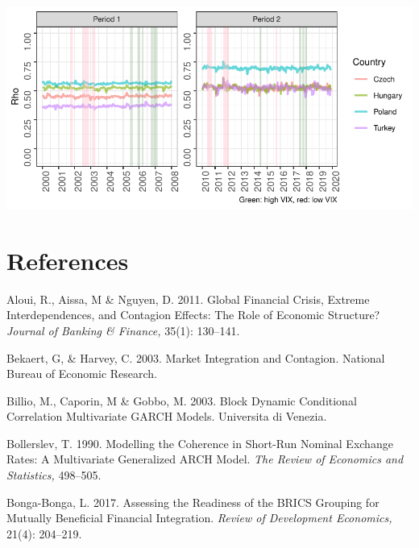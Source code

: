 \documentclass[11pt,preprint, authoryear]{elsarticle}
\let\origfigure\figure
\let\endorigfigure\endfigure
\renewenvironment{figure}[1][2] {
    \expandafter\origfigure\expandafter[H]
} {
    \endorigfigure
}
\numberwithin{equation}{section}
\numberwithin{figure}{section}
\numberwithin{table}{section}
\begin{document}
\begin{figure}[H]

{\centering \includegraphics{Template_files/figure-latex/dcc9-1} 

}

\caption{South Africa-Europe DCC\label{dcc9}}\label{fig:dcc9}
\end{figure}

\newpage

\hypertarget{references}{%
\section*{\texorpdfstring{References
\label{References}}{References }}\label{references}}

\hypertarget{refs}{}
\leavevmode\hypertarget{ref-aloui2011global}{}%
Aloui, R., Aissa, M \& Nguyen, D. 2011.
Global Financial Crisis, Extreme Interdependences, and Contagion
Effects: The Role of Economic Structure? \emph{Journal of Banking \&
Finance,} 35(1): 130--141.

\leavevmode\hypertarget{ref-bekaert2003market}{}%
Bekaert, G, \& Harvey, C. 2003. Market Integration and
Contagion. National Bureau of Economic Research.

\leavevmode\hypertarget{ref-billio2003block}{}%
Billio, M., Caporin, M \& Gobbo, M. 2003. Block
Dynamic Conditional Correlation Multivariate GARCH Models. Universita di Venezia.

\leavevmode\hypertarget{ref-bollerslev1990modelling}{}%
Bollerslev, T. 1990. Modelling the Coherence in Short-Run Nominal
Exchange Rates: A Multivariate Generalized ARCH Model. \emph{The
Review of Economics and Statistics,} 498--505.

\leavevmode\hypertarget{ref-bonga2017assessing}{}%
Bonga-Bonga, L. 2017. Assessing the Readiness of the BRICS
Grouping for Mutually Beneficial Financial Integration. \emph{Review
of Development Economics,} 21(4): 204--219.
\end{document}
